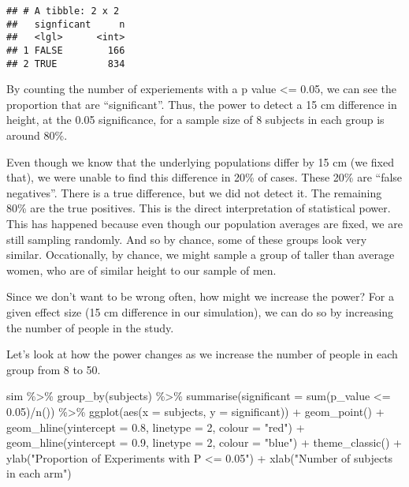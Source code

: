 \documentclass[
]{article}
\newenvironment{Shaded}{\begin{snugshade}}{\end{snugshade}}
\newcommand{\AttributeTok}[1]{\textcolor[rgb]{0.77,0.63,0.00}{#1}}
\newcommand{\DecValTok}[1]{\textcolor[rgb]{0.00,0.00,0.81}{#1}}
\newcommand{\FloatTok}[1]{\textcolor[rgb]{0.00,0.00,0.81}{#1}}
\newcommand{\FunctionTok}[1]{\textcolor[rgb]{0.00,0.00,0.00}{#1}}
\newcommand{\NormalTok}[1]{#1}
\newcommand{\SpecialCharTok}[1]{\textcolor[rgb]{0.00,0.00,0.00}{#1}}
\newcommand{\StringTok}[1]{\textcolor[rgb]{0.31,0.60,0.02}{#1}}
\begin{document}
\begin{verbatim}
## # A tibble: 2 x 2
##   signficant     n
##   <lgl>      <int>
## 1 FALSE        166
## 2 TRUE         834
\end{verbatim}

By counting the number of experiements with a p value \textless= 0.05,
we can see the proportion that are ``significant''. Thus, the power to
detect a 15 cm difference in height, at the 0.05 significance, for a
sample size of 8 subjects in each group is around 80\%.

Even though we know that the underlying populations differ by 15 cm (we
fixed that), we were unable to find this difference in 20\% of cases.
These 20\% are ``false negatives''. There is a true difference, but we
did not detect it. The remaining 80\% are the true positives. This is
the direct interpretation of statistical power. This has happened
because even though our population averages are fixed, we are still
sampling randomly. And so by chance, some of these groups look very
similar. Occationally, by chance, we might sample a group of taller than
average women, who are of similar height to our sample of men.

Since we don't want to be wrong often, how might we increase the power?
For a given effect size (15 cm difference in our simulation), we can do
so by increasing the number of people in the study.

Let's look at how the power changes as we increase the number of people
in each group from 8 to 50.

\begin{Shaded}
\begin{Highlighting}[]
\NormalTok{sim }\SpecialCharTok{\%\textgreater{}\%}
    \FunctionTok{group\_by}\NormalTok{(subjects) }\SpecialCharTok{\%\textgreater{}\%}
    \FunctionTok{summarise}\NormalTok{(}\AttributeTok{significant =} \FunctionTok{sum}\NormalTok{(p\_value }\SpecialCharTok{\textless{}=} \FloatTok{0.05}\NormalTok{)}\SpecialCharTok{/}\FunctionTok{n}\NormalTok{()) }\SpecialCharTok{\%\textgreater{}\%}
    \FunctionTok{ggplot}\NormalTok{(}\FunctionTok{aes}\NormalTok{(}\AttributeTok{x =}\NormalTok{ subjects, }\AttributeTok{y =}\NormalTok{ significant)) }\SpecialCharTok{+} \FunctionTok{geom\_point}\NormalTok{() }\SpecialCharTok{+}
    \FunctionTok{geom\_hline}\NormalTok{(}\AttributeTok{yintercept =} \FloatTok{0.8}\NormalTok{, }\AttributeTok{linetype =} \DecValTok{2}\NormalTok{, }\AttributeTok{colour =} \StringTok{"red"}\NormalTok{) }\SpecialCharTok{+}
    \FunctionTok{geom\_hline}\NormalTok{(}\AttributeTok{yintercept =} \FloatTok{0.9}\NormalTok{, }\AttributeTok{linetype =} \DecValTok{2}\NormalTok{, }\AttributeTok{colour =} \StringTok{"blue"}\NormalTok{) }\SpecialCharTok{+}
  \FunctionTok{theme\_classic}\NormalTok{() }\SpecialCharTok{+}
  \FunctionTok{ylab}\NormalTok{(}\StringTok{"Proportion of Experiments with P \textless{}= 0.05"}\NormalTok{) }\SpecialCharTok{+}
  \FunctionTok{xlab}\NormalTok{(}\StringTok{"Number of subjects in each arm"}\NormalTok{)}
\end{Highlighting}
\end{Shaded}
\end{document}
